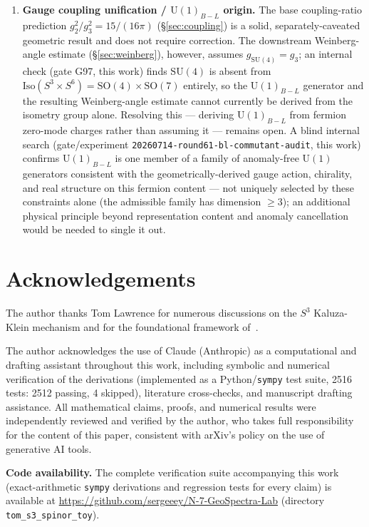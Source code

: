\documentclass[12pt,a4paper]{article}
\begin{document}
\begin{enumerate}
\item \textbf{Gauge coupling unification / $\mathrm{U}(1)_{B-L}$ origin.} The base
  coupling-ratio prediction $g_2^2/g_3^2=15/(16\pi)$ (\S\ref{sec:coupling}) is a solid,
  separately-caveated geometric result and does not require correction. The downstream
  Weinberg-angle estimate (\S\ref{sec:weinberg}), however, assumes
  $g_{\mathrm{SU}(4)}=g_3$; an internal check (gate G97, this work) finds $\mathrm{SU}(4)$
  is absent from $\mathrm{Iso}(S^3\times S^6)=\mathrm{SO}(4)\times\mathrm{SO}(7)$
  entirely, so the $\mathrm{U}(1)_{B-L}$ generator and the resulting Weinberg-angle
  estimate cannot currently be derived from the isometry group alone. Resolving this ---
  deriving $\mathrm{U}(1)_{B-L}$ from fermion zero-mode charges rather than assuming it
  --- remains open. A blind internal search (gate/experiment
  \texttt{20260714-round61-bl-commutant-audit}, this work) confirms $\mathrm{U}(1)_{B-L}$
  is one member of a family of anomaly-free $\mathrm{U}(1)$ generators consistent with the
  geometrically-derived gauge action, chirality, and real structure on this fermion content
  --- not uniquely selected by these constraints alone (the admissible family has dimension
  $\geq 3$); an additional physical principle beyond representation content and anomaly
  cancellation would be needed to single it out.
\end{enumerate}

\section*{Acknowledgements}

The author thanks Tom Lawrence for numerous discussions on the $S^3$ Kaluza-Klein mechanism
and for the foundational framework of~\cite{Lawrence2022}.

The author acknowledges the use of Claude (Anthropic) as a computational and drafting
assistant throughout this work, including symbolic and numerical verification of the
derivations (implemented as a Python/\texttt{sympy} test suite, 2516 tests:
2512 passing, 4 skipped),
literature cross-checks, and manuscript drafting assistance. All mathematical claims,
proofs, and numerical results were independently reviewed and verified by the author,
who takes full responsibility for the content of this paper, consistent with arXiv's
policy on the use of generative AI tools.

\medskip
\noindent\textbf{Code availability.} The complete verification suite accompanying this
work (exact-arithmetic \texttt{sympy} derivations and regression tests for every claim)
is available at \url{https://github.com/sergeeey/N-7-GeoSpectra-Lab}
(directory \texttt{tom\_s3\_spinor\_toy}).
\end{document}

